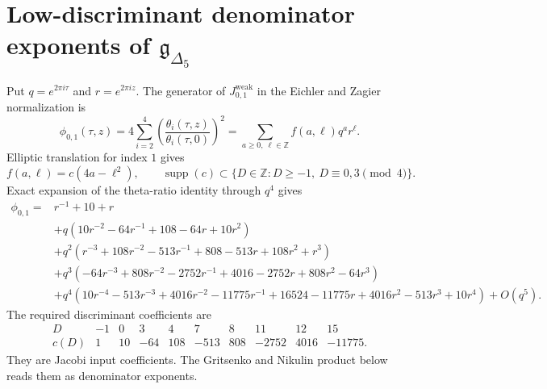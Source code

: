 \providecommand{\kappaBKM}{\kappa_{\mathrm{BKM}}}
\providecommand{\kappaCh}{\kappa_{\mathrm{ch}}}
\providecommand{\kappaCat}{\kappa_{\mathrm{cat}}}
\providecommand{\kappaHeis}{\kappa_{\mathrm{ch}}^{\mathrm{Heis}}}
\providecommand{\kappaFiber}{\kappa_{\mathrm{fiber}}}
\providecommand{\gDeltaFive}{\mathfrak g_{\Delta_5}}
\providecommand{\phizo}{\phi_{0,1}}
\providecommand{\Z}{\mathbb{Z}}
\providecommand{\smult}{\operatorname{smult}}

\section*{Low-discriminant denominator exponents of
\texorpdfstring{$\gDeltaFive$}{g Delta5}}

Put \(q=e^{2\pi i\tau}\) and \(r=e^{2\pi iz}\).  The generator of
\(J^{\mathrm{weak}}_{0,1}\) in the Eichler and Zagier normalization is
\[
  \phizo(\tau,z)
  =
  4\sum_{i=2}^{4}
  \left(\frac{\theta_i(\tau,z)}{\theta_i(\tau,0)}\right)^2
  =
  \sum_{a\geq 0,\ \ell\in\Z} f(a,\ell)q^a r^\ell .
\]
Elliptic translation for index \(1\) gives
\[
  f(a,\ell)=c(4a-\ell^2),
  \qquad
  \operatorname{supp}(c)\subset
  \{D\in\Z:D\geq -1,\ D\equiv 0,3 \pmod 4\}.
\]
Exact expansion of the theta-ratio identity through \(q^4\) gives
\[
\begin{aligned}
\phizo
={}& r^{-1}+10+r \\
&+q(10r^{-2}-64r^{-1}+108-64r+10r^2)\\
&+q^2(r^{-3}+108r^{-2}-513r^{-1}+808-513r+108r^2+r^3)\\
&+q^3(-64r^{-3}+808r^{-2}-2752r^{-1}+4016-2752r+808r^2-64r^3)\\
&+q^4(10r^{-4}-513r^{-3}+4016r^{-2}-11775r^{-1}
      +16524-11775r+4016r^2-513r^3+10r^4)+O(q^5).
\end{aligned}
\]
The required discriminant coefficients are
\[
  \begin{array}{c|ccccccccc}
    D & -1 & 0 & 3 & 4 & 7 & 8 & 11 & 12 & 15 \\ \hline
    c(D) & 1 & 10 & -64 & 108 & -513 & 808 & -2752 & 4016 & -11775 .
  \end{array}
\]
They are Jacobi input coefficients.  The Gritsenko and Nikulin product
below reads them as denominator exponents.

